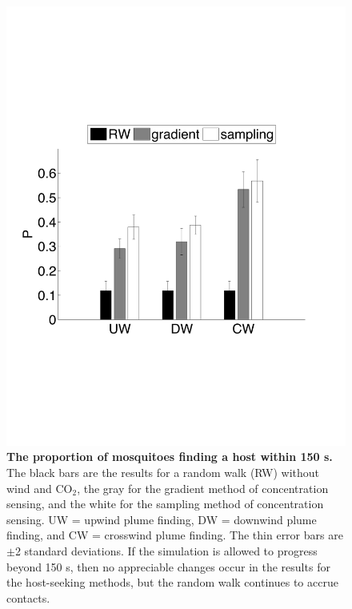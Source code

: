 \documentclass[10pt]{article}
\begin{document}
\begin{figure}[!htp]
\includegraphics[width=4.5in]{revised2figs/Figure3}
\caption{
{\bf The proportion of mosquitoes finding a host within 150 s.} The black bars are the results for a random walk (RW) without wind and CO$_2$, the gray for the gradient method of concentration sensing, and the white for the sampling method of concentration sensing. UW = upwind plume finding, DW = downwind plume finding, and CW = crosswind plume finding. The thin error bars are $\pm$2 standard deviations. If the simulation is allowed to progress beyond 150 s, then no appreciable changes occur in the results for the host-seeking methods, but the random walk continues to accrue contacts. }
\label{fig:rulecomp}
\end{figure}
\end{document}
